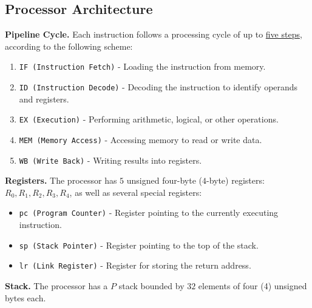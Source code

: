 \subsection*{Processor Architecture}
\noindent
\textbf{Pipeline Cycle.} \quad
Each instruction follows a processing cycle of up to \underline{five 
steps}, according to the following scheme:
\begin{enumerate}
  \item \texttt{IF (Instruction Fetch)} - Loading the instruction 
    from memory.
  \item \texttt{ID (Instruction Decode)} - Decoding the instruction 
    to identify operands and registers.
  \item \texttt{EX (Execution)} - Performing arithmetic, logical, or 
    other operations.
  \item \texttt{MEM (Memory Access)} - Accessing memory to read or 
    write data.
  \item \texttt{WB (Write Back)} - Writing results into registers.
\end{enumerate}
\medskip

\noindent
\textbf{Registers.} \quad
The processor has $5$ unsigned four-byte ($4$-byte) registers: $R_0, 
R_1, R_2, R_3, R_4$, as well as several special registers:
\begin{itemize}
  \item \texttt{pc (Program Counter)} - Register pointing to the 
    currently executing instruction.
  \item \texttt{sp (Stack Pointer)} - Register pointing to the top of 
    the stack.
  \item \texttt{lr (Link Register)} - Register for storing the return 
    address.
\end{itemize}

\noindent
\textbf{Stack.} \quad
The processor has a $P$ stack bounded by $32$ elements of four (4) 
unsigned bytes each. 
